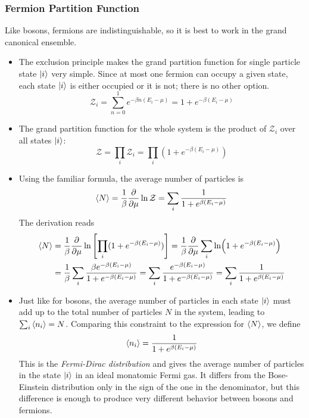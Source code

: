 \documentclass[11pt, a4paper]{article}
\begin{document}
\subsubsection{Fermion Partition Function}
Like bosons, fermions are indistinguishable, so it is best to work in the grand canonical ensemble.
\begin{itemize}
	\item The exclusion principle makes the grand partition function for single particle state $ \ket{i} $ very simple. Since at most one fermion can occupy a given state, each state $ \ket{i} $ is either occupied or it is not; there is no other option.
	\begin{equation*}
		\mathcal{Z}_{i} = \sum_{n=0}^{1}e^{-\beta n(E_{i}-\mu)} = 1 + e^{-\beta(E_{i} - \mu)}
	\end{equation*}
	
	\item The grand partition function for the whole system is the product of $ \mathcal{Z}_{i} $ over all states $ \ket{i} $:
	\begin{equation*}
		\mathcal{Z} = \prod_{i} \mathcal{Z}_{i} = \prod_{i} (1 + e^{-\beta(E_{i} - \mu)})
	\end{equation*}
	
	\item Using the familiar formula, the average number of particles is
	\begin{equation*}
		\expval{N} = \frac{1}{\beta}\pdv{}{\mu} \ln \mathcal{Z} = \sum_{i} \frac{1}{1 + e^{\beta (E_{i} - \mu)}}
	\end{equation*}
	The derivation reads
	\begin{align*}
		\expval{N} &= \frac{1}{\beta}\pdv{}{\mu} \ln \left[\prod_{i} (1 + e^{-\beta(E_{i} - \mu)})\right] = \frac{1}{\beta} \pdv{}{\mu} \sum_{i} \ln(1 + e^{-\beta(E_{i} - \mu)})\\
		&=\frac{1}{\beta} \sum_{i} \frac{\beta e^{-\beta(E_{i}-\mu)}}{1 + e^{-\beta(E_{i} - \mu)}} = \sum_{i} \frac{e^{-\beta(E_{i}-\mu)}}{1 + e^{-\beta(E_{i} - \mu)}} = \sum_{i} \frac{1}{1 + e^{\beta (E_{i} - \mu)}}
	\end{align*}
	
	\item Just like for bosons, the average number of particles in each state $ \ket{i} $ must add up to the total number of particles $ N $ in the system, leading to $ \sum_{i}\expval{n_{i}} = N $. Comparing this constraint to the expression for $ \expval{N} $, we define
	\begin{equation*}
		\expval{n_{i}} =  \frac{1}{1 + e^{\beta (E_{i} - \mu)}}
	\end{equation*}
	This is the \textit{Fermi-Dirac distribution} and gives the average number of particles in the state $ \ket{i} $ in an ideal monatomic Fermi gas. It differs from the Bose-Einstein distribution only in the sign of the one in the denominator, but this difference is enough to produce very different behavior between bosons and fermions.
	

\end{itemize}
\end{document}
